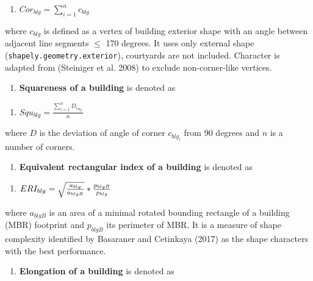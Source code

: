 \documentclass[
  letterpaper,
  DIV=11,
  numbers=noendperiod]{scrartcl}
\providecommand{\tightlist}{%
  \setlength{\itemsep}{0pt}\setlength{\parskip}{0pt}}\usepackage{longtable,booktabs,array}
\begin{document}
\begin{enumerate}
\def\labelenumi{(\arabic{enumi})}
\setcounter{enumi}{4}
\tightlist
\item
  \(Cor_{blg} = \sum_{i=1}^{n}{c_{blg}}\)
\end{enumerate}

where \(c_{blg}\) is defined as a vertex of building exterior shape with
an angle between adjacent line segments \(\leq\) 170 degrees. It uses
only external shape (\texttt{shapely.geometry.exterior}), courtyards are
not included. Character is adapted from (Steiniger et al. 2008) to
exclude non-corner-like vertices.

\begin{enumerate}
\def\labelenumi{\arabic{enumi}.}
\setcounter{enumi}{5}
\tightlist
\item
  \textbf{Squareness of a building} is denoted as
\end{enumerate}

\begin{enumerate}
\def\labelenumi{(\arabic{enumi})}
\setcounter{enumi}{5}
\tightlist
\item
  \(Squ_{blg} =  \frac{\sum_{i=1}^{n} D_{c_{blg_i}}}{n}\)
\end{enumerate}

where \(D\) is the deviation of angle of corner \(c_{blg_i}\) from 90
degrees and \(n\) is a number of corners.

\begin{enumerate}
\def\labelenumi{\arabic{enumi}.}
\setcounter{enumi}{6}
\tightlist
\item
  \textbf{Equivalent rectangular index of a building} is denoted as
\end{enumerate}

\begin{enumerate}
\def\labelenumi{(\arabic{enumi})}
\setcounter{enumi}{6}
\tightlist
\item
  \(ERI_{blg} =  \sqrt{{a_{blg}} \over {a_{blgB}}} * {p_{blgB} \over p_{blg}}\)
\end{enumerate}

where \(a_{blgB}\) is an area of a minimal rotated bounding rectangle of
a building (MBR) footprint and \(p_{blgB}\) its perimeter of MBR. It is
a measure of shape complexity identified by Basaraner and Cetinkaya
(2017) as the shape characters with the best performance.

\begin{enumerate}
\def\labelenumi{\arabic{enumi}.}
\setcounter{enumi}{7}
\tightlist
\item
  \textbf{Elongation of a building} is denoted as
\end{enumerate}
\end{document}
